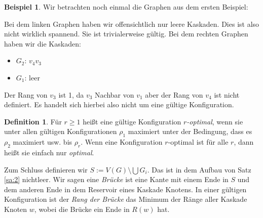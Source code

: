 \documentclass[12pt,a4paper]{scrartcl}
\numberwithin{equation}{section} %
\theoremstyle{definition}
\newtheorem{defn}[auf]{Definition}
\newtheorem{bsp}[auf]{Beispiel}
\theoremstyle{plain}
\begin{document}
\begin{bsp}
    Wir betrachten noch einmal die Graphen aus dem ersten Beispiel:
        \begin{figure}[h]
        \centering
    \end{figure}
    Bei dem linken Graphen haben wir offensichtlich nur leere Kaskaden. Dies ist also nicht wirklich spannend. Sie ist trivialerweise gültig.
    Bei dem rechten Graphen haben wir die Kaskaden:
    \begin{itemize}
        \item $G_2$: $v_4 v_3$
        \item $G_1$: leer
    \end{itemize}
    Der Rang von $v_3$ ist 1, da $v_3$ Nachbar von $v_1$ aber der Rang von $v_4$ ist nicht definiert. Es handelt sich hierbei also nicht um eine gültige Konfiguration.
\end{bsp}
\begin{defn}
Für $r\ge 1$ heißt eine gültige Konfiguration \emph{$r$-optimal}, wenn sie unter allen gültigen Konfigurationen $\rho_1$ maximiert unter der Bedingung, dass es $\rho_2$ maximiert usw. bis $\rho_r$. Wenn eine Konfiguration $r$-optimal ist für alle $r$, dann heißt sie einfach nur \emph{optimal}. \par 
Zum Schluss definieren wir $S:=V(G)\setminus \bigcup G_i$. Das ist in dem Aufbau von Satz \ref{sa:2} nichtleer. Wir sagen eine \emph{Brücke} ist eine Kante mit einem Ende in $S$ und dem anderen Ende in dem Reservoir eines Kaskade Knotens. In einer gültigen Konfiguration ist der \emph{Rang der Brücke} das Minimum der Ränge aller Kaskade Knoten $w$, wobei die Brücke ein Ende in $R(w)$ hat. 
\end{defn}
\end{document}
